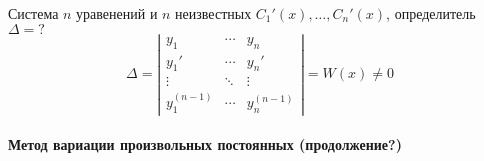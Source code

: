 \documentclass[11pt,a4paper,oneside]{report}
\theoremstyle{definition}
\theoremstyle{plain}
\theoremstyle{remark}
\begin{document}
\begin{enumerate}
          Система $n$ уравенений и $n$ неизвестных $C_1'(x), \ldots, C_n'(x)$, определитель $\Delta = ?$
          \begin{equation*}
              \Delta = \left|\begin{matrix}
                  y_1         & \cdots & y_n         \\
                  y_1'        & \cdots & y_n'        \\
                  \vdots      & \ddots & \vdots      \\
                  y_1^{(n-1)} & \cdots & y_n^{(n-1)}
              \end{matrix}\right| = W(x) \ne 0
          \end{equation*}
\end{enumerate}

\paragraph*{Метод вариации произвольных постоянных (продолжение?)}
\end{document}
